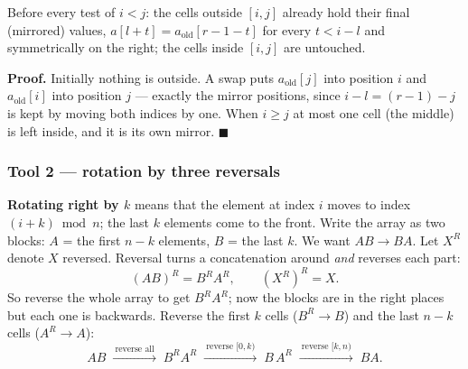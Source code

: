 \begin{invariantbox}
Before every test of $i < j$: the cells outside $[i, j]$ already hold their final (mirrored) values, $a[l+t] = a_{\text{old}}[r-1-t]$ for every $t < i-l$ and symmetrically on the right; the cells inside $[i, j]$ are untouched.

\textbf{Proof.} Initially nothing is outside. A swap puts $a_{\text{old}}[j]$ into position $i$ and $a_{\text{old}}[i]$ into position $j$ --- exactly the mirror positions, since $i - l = (r-1) - j$ is kept by moving both indices by one. When $i \ge j$ at most one cell (the middle) is left inside, and it is its own mirror. \hfill$\blacksquare$
\end{invariantbox}

\subsubsection*{Tool 2 --- rotation by three reversals}

\textbf{Rotating right by $k$} means that the element at index $i$ moves to index $(i + k) \bmod n$; the last $k$ elements come to the front. Write the array as two blocks: $A$ = the first $n-k$ elements, $B$ = the last $k$. We want $AB \to BA$. Let $X^R$ denote $X$ reversed. Reversal turns a concatenation around \emph{and} reverses each part:
\[
(AB)^R = B^R A^R, \qquad (X^R)^R = X .
\]
So reverse the whole array to get $B^R A^R$; now the blocks are in the right places but each one is backwards. Reverse the first $k$ cells ($B^R \to B$) and the last $n-k$ cells ($A^R \to A$):
\[
AB \;\xrightarrow{\ \text{reverse all}\ }\; B^R A^R \;\xrightarrow{\ \text{reverse }[0,k)\ }\; B\,A^R \;\xrightarrow{\ \text{reverse }[k,n)\ }\; BA .
\]


